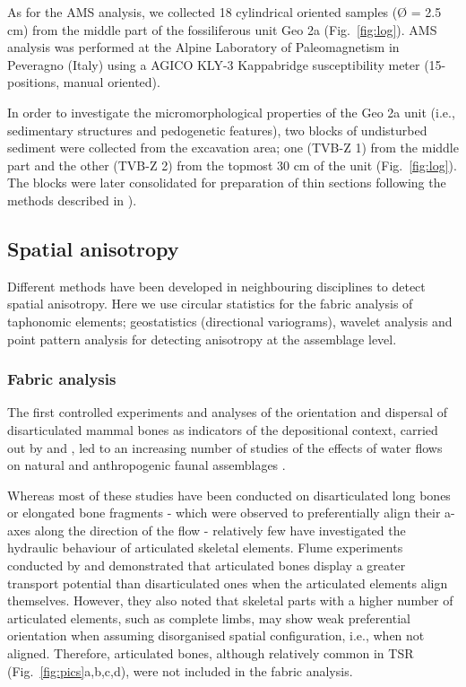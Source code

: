 \documentclass[review,times,authoryear]{elsarticle} %
\begin{document}
As for the AMS analysis, we collected 18 cylindrical oriented samples (Ø = 2.5 cm) from the middle part of the fossiliferous unit Geo 2a (Fig.~\ref{fig:log}). AMS analysis was performed at the Alpine Laboratory of Paleomagnetism in Peveragno (Italy) using a AGICO KLY-3 Kappabridge susceptibility meter (15-positions, manual oriented).

In order to investigate the micromorphological properties of the Geo 2a unit (i.e., sedimentary structures and pedogenetic features), two blocks of undisturbed sediment were collected from the excavation area; one (TVB-Z 1) from the middle part and the other (TVB-Z 2) from the topmost 30 cm of the unit (Fig.~\ref{fig:log}). The blocks were later consolidated for preparation of thin sections following the methods described in \citet{Murphy1986}).

\subsection{Spatial anisotropy}

Different methods have been developed in neighbouring disciplines to detect spatial anisotropy. Here we use circular statistics for the fabric analysis of taphonomic elements; geostatistics (directional variograms), wavelet analysis and point pattern analysis for detecting anisotropy at the assemblage level.

\subsubsection{Fabric analysis}

The first controlled experiments and analyses of the orientation and dispersal of disarticulated  mammal bones as indicators of the depositional context, carried out by \cite{Toots1965} and \cite{Voorhies1969}, led to an increasing number of studies of the effects of water flows on natural and anthropogenic faunal assemblages \citep[][among others]{Nash1987,Schick1987a,Petraglia1987,Petraglia1994,Fiorillo1991,Benito-Calvo2011,Torre2013a,Dominguez-Rodrigo2012,Dominguez-Rodrigo2014,Dominguez-Rodrigo2014c,Cobo-Sanchez2014,Aramendi2017,Organista2017}.

Whereas most of these studies have been conducted on disarticulated long bones or elongated bone fragments - which were observed to preferentially align their a-axes along the direction of the flow - relatively few have investigated the hydraulic behaviour of articulated skeletal elements. Flume experiments conducted by \cite{Coard1995} and \cite{Coard1999} demonstrated that articulated bones display a greater transport potential than disarticulated ones when the articulated elements align themselves. However, they also noted that skeletal parts with a higher number of articulated elements, such as complete limbs, may show weak preferential orientation when assuming disorganised spatial configuration, i.e., when not aligned. Therefore, articulated bones, although relatively common in TSR (Fig.~\ref{fig:pics}a,b,c,d), were not included in the fabric analysis.
\end{document}

